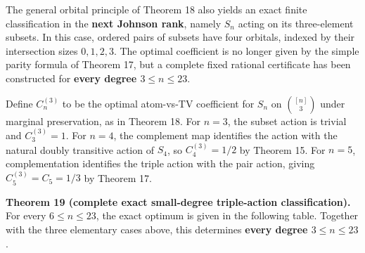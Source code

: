 \documentclass[
  11pt,
]{article}
\begin{document}
The general orbital principle of Theorem 18 also yields an exact finite
classification in the \textbf{next Johnson rank}, namely \(S_n\) acting
on its three-element subsets. In this case, ordered pairs of subsets
have four orbitals, indexed by their intersection sizes \(0,1,2,3\). The
optimal coefficient is no longer given by the simple parity formula of
Theorem 17, but a complete fixed rational certificate has been
constructed for \textbf{every degree \(3\le n\le23\)}.

Define \(C_n^{(3)}\) to be the optimal atom-vs-TV coefficient for
\(S_n\) on \(\binom{[n]}3\) under marginal preservation, as in Theorem
18. For \(n=3\), the subset action is trivial and \(C_3^{(3)}=1\). For
\(n=4\), the complement map identifies the action with the natural
doubly transitive action of \(S_4\), so \(C_4^{(3)}=1/2\) by Theorem 15.
For \(n=5\), complementation identifies the triple action with the pair
action, giving \(C_5^{(3)}=C_5=1/3\) by Theorem 17.

\textbf{Theorem 19 (complete exact small-degree triple-action
classification).} For every \(6\le n\le23\), the exact optimum is given
in the following table. Together with the three elementary cases above,
this determines \textbf{every degree \(3\le n\le23\)}.
\end{document}
